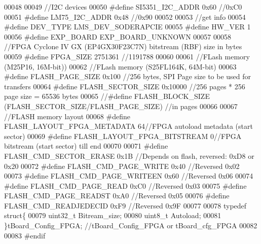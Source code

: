 \begin{DoxyCode}
00048 
00049 \textcolor{comment}{//I2C devices}
00050 \textcolor{preprocessor}{#define SI5351\_I2C\_ADDR     0x60 //0xC0}
00051 \textcolor{preprocessor}{#define   LM75\_I2C\_ADDR     0x48 //0x90}
00052 
00053 \textcolor{comment}{//get info}
00054 \textcolor{preprocessor}{#define DEV\_TYPE            LMS\_DEV\_SODERAPCIE}
00055 \textcolor{preprocessor}{#define HW\_VER              1}
00056 \textcolor{preprocessor}{#define EXP\_BOARD           EXP\_BOARD\_UNKNOWN}
00057 
00058 \textcolor{comment}{//FPGA Cyclone IV GX (EP4GX30F23C7N) bitstream (RBF) size in bytes}
00059 \textcolor{preprocessor}{#define FPGA\_SIZE           2751361 //1191788}
00060 
00061 \textcolor{comment}{//FLash memory (M25P16, 16M-bit))}
00062 \textcolor{comment}{//FLash memory (S25FL164K, 64M-bit)}
00063 \textcolor{preprocessor}{#define FLASH\_PAGE\_SIZE     0x100 //256 bytes, SPI Page size to be used for transfers}
00064 \textcolor{preprocessor}{#define FLASH\_SECTOR\_SIZE   0x10000 //256 pages * 256 page size = 65536 bytes}
00065 \textcolor{comment}{//#define FLASH\_BLOCK\_SIZE  (FLASH\_SECTOR\_SIZE/FLASH\_PAGE\_SIZE) //in pages}
00066 
00067 \textcolor{comment}{//FLASH memory layout}
00068 \textcolor{preprocessor}{#define FLASH\_LAYOUT\_FPGA\_METADATA  64//FPGA autoload metadata (start sector)}
00069 \textcolor{preprocessor}{#define FLASH\_LAYOUT\_FPGA\_BITSTREAM 0//FPGA bitstream (start sector) till end}
00070 
00071 \textcolor{preprocessor}{#define FLASH\_CMD\_SECTOR\_ERASE 0x1B //Depends on flash, reversed: 0xD8 or 0x20}
00072 \textcolor{preprocessor}{#define FLASH\_CMD\_PAGE\_WRITE   0x40 //Reversed 0x02}
00073 \textcolor{preprocessor}{#define FLASH\_CMD\_PAGE\_WRITEEN 0x60 //Reversed 0x06}
00074 \textcolor{preprocessor}{#define FLASH\_CMD\_PAGE\_READ    0xC0 //Reversed 0x03}
00075 \textcolor{preprocessor}{#define FLASH\_CMD\_PAGE\_READST  0xA0 //Reversed 0x05}
00076 \textcolor{preprocessor}{#define FLASH\_CMD\_READJEDECID  0xF9 //Reversed 0x9F}
00077 
00078 \textcolor{keyword}{typedef} \textcolor{keyword}{struct}\{
00079     uint32\_t Bitream_size;
00080     uint8\_t Autoload;
00081 \}tBoard_Config_FPGA; \textcolor{comment}{//tBoard\_Config\_FPGA or tBoard\_cfg\_FPGA}
00082 
00083 \textcolor{preprocessor}{#endif}
\end{DoxyCode}
